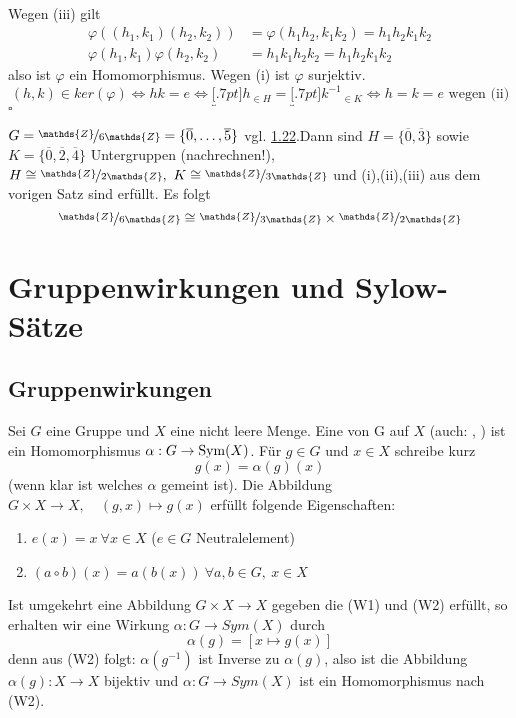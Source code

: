 \\
Wegen (iii) gilt
\begin{equation*}
\begin{aligned}
	\varphi((h_1,k_1)(h_2,k_2)) &= \varphi(h_1h_2,k_1k_2)=h_1h_2k_1k_2\\
	\varphi(h_1,k_1)\varphi(h_2,k_2) &= h_1k_1h_2k_2=h_1h_2k_1k_2
\end{aligned}
\end{equation*}
also ist $\varphi$ ein Homomorphismus. Wegen (i) ist $\varphi$ surjektiv.\[ (h,k)\in ker(\varphi) \Leftrightarrow hk=e \Leftrightarrow \underbracket[.7pt]{h}_{\in H}=\underbracket[.7pt]{k^{-1}}_{\in K} \Leftrightarrow h=k=e \text{ wegen (ii)}\]
\hfill $\square$

$G=\nicefrac{\mathds{Z}}{6\mathds{Z}}=\{\overline{0},\dots,\overline{5}\}$ vgl. \hyperref[sub:satz_eigenschaften]{1.22}.Dann sind $H=\{\overline{0},\overline{3}\}$ sowie $K=\{\overline{0},\overline{2},\overline{4}\}$ Untergruppen (nachrechnen!), $H\cong \nicefrac{\mathds{Z}}{2\mathds{Z}},~K\cong \nicefrac{\mathds{Z}}{3\mathds{Z}}$ und (i),(ii),(iii) aus dem vorigen Satz sind erfüllt. Es folgt
\[\nicefrac{\mathds{Z}}{6\mathds{Z}}\cong \nicefrac{\mathds{Z}}{3\mathds{Z}}\times \nicefrac{\mathds{Z}}{2\mathds{Z}} \]

\newpage

\section{Gruppenwirkungen und Sylow-Sätze}
\label{sec:gruppen_sylow}

\subsection{Gruppenwirkungen}
\label{sub:gruppenwirkungen}
Sei $G$ eine Gruppe und $X$ eine nicht leere Menge. Eine  von G auf $X$ (auch: , ) ist ein Homomorphismus $\alpha:G\to \operatorname{Sym}(X)$. Für $g\in G$ und $x\in X$ schreibe kurz \[g(x)=\alpha(g)(x) \] (wenn klar ist welches $\alpha$ gemeint ist). Die Abbildung $G\times X\to X,\quad (g,x)\mapsto g(x)$ erfüllt folgende Eigenschaften:
\begin{enumerate}[(W1)]
	\item $e(x)=x~\forall x\in X$ ($e\in G$ Neutralelement)
	\item $(a\circ b)(x)=a(b(x))~\forall a,b\in G,~x\in X$
\end{enumerate}
Ist umgekehrt eine Abbildung $G\times X\to X$ gegeben die (W1) und (W2) erfüllt, so erhalten wir eine Wirkung $\alpha: G\to Sym(X)$ durch \[\alpha(g)=[x\mapsto g(x)] \]
denn aus (W2) folgt: $\alpha(g^{-1})$ ist Inverse zu $\alpha(g)$, also ist die Abbildung $\alpha(g):X\to X$ bijektiv und $\alpha:G\to Sym(X)$ ist ein Homomorphismus nach (W2).

